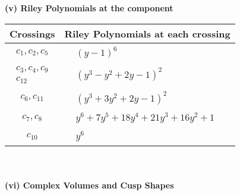 \documentclass[1p]{elsarticle_modified}
\theoremstyle{definition}
\begin{document}
\newpage\renewcommand{\arraystretch}{1}
\flushleft \textbf{(v) Riley Polynomials at the component}\newline \\
\begin{tabular}{m{50pt}|m{274pt}}
Crossings & \hspace{64pt}Riley Polynomials at each crossing \\
\hline $$\begin{aligned}c_{1},c_{2},c_{5}\end{aligned}$$&$\begin{aligned}
&(y-1)^6
\end{aligned}$\\
\hline $$\begin{aligned}c_{3},c_{4},c_{9}\\c_{12}\end{aligned}$$&$\begin{aligned}
&(y^3- y^2+2 y-1)^2
\end{aligned}$\\
\hline $$\begin{aligned}c_{6},c_{11}\end{aligned}$$&$\begin{aligned}
&(y^3+3 y^2+2 y-1)^2
\end{aligned}$\\
\hline $$\begin{aligned}c_{7},c_{8}\end{aligned}$$&$\begin{aligned}
&y^6+7 y^5+18 y^4+21 y^3+16 y^2+1
\end{aligned}$\\
\hline $$\begin{aligned}c_{10}\end{aligned}$$&$\begin{aligned}
&y^6
\end{aligned}$\\
\hline
\end{tabular}\\~\\
\newpage\flushleft \textbf{(vi) Complex Volumes and Cusp Shapes}
\end{document}

